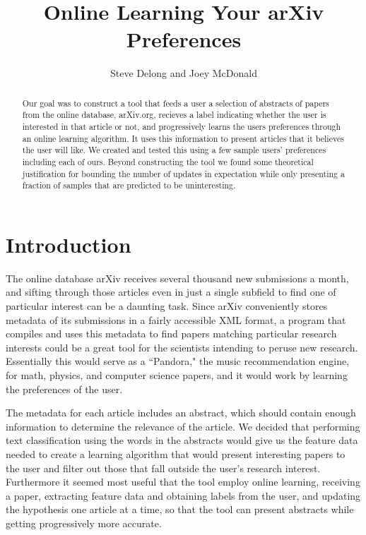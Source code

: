 \documentclass[12pt]{article}
\begin{document}
\title{Online Learning Your arXiv Preferences}
\author{Steve Delong and Joey McDonald}
\maketitle
\begin{abstract}
Our goal was to construct a tool that feeds a user a selection of abstracts of papers from the online database, arXiv.org, recieves a label indicating whether the user is interested in that article or not, and progressively learns the users preferences through an online learning algorithm. It uses this information to present articles that it believes the user will like. We created and tested this using a few sample users' preferences including each of ours. Beyond constructing the tool we found some theoretical justification for bounding the number of updates in expectation while only presenting a fraction of samples that are predicted to be uninteresting.
\end{abstract}

\section{Introduction}

The online database arXiv receives several thousand new submissions a month, and sifting through those articles even in just a single subfield to find one of particular interest can be a daunting task. Since arXiv conveniently stores metadata of its submissions in a fairly accessible XML format, a program that compiles and uses this metadata to find papers matching particular research interests could be a great tool for the scientists intending to peruse new research. Essentially this would serve as a ``Pandora," the music recommendation engine, for math, physics, and computer science papers, and it would work by learning the preferences of the user.

The metadata for each article includes an abstract, which should contain enough information to determine the relevance of the article. We decided that performing text classification using the words in the abstracts would give us the feature data needed to create a learning algorithm that would present interesting papers to the user and filter out those that fall outside the user's research interest. Furthermore it seemed most useful that the tool employ online learning, receiving a paper, extracting feature data and obtaining labels from the user, and updating the hypothesis one article at a time, so that the tool can present abstracts while getting progressively more accurate.
\end{document}
